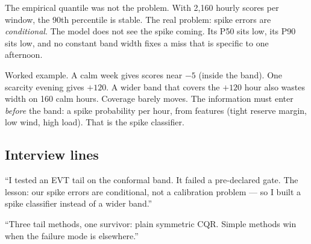 The empirical quantile was not the problem. With 2{,}160 hourly
scores per window, the 90th percentile is stable. The real problem:
spike errors are \emph{conditional}. The model does not see the
spike coming. Its P50 sits low, its P90 sits low, and no constant
band width fixes a miss that is specific to one afternoon.

Worked example. A calm week gives scores near $-5$ (inside the band).
One scarcity evening gives $+120$. A wider band that covers the $+120$
hour also wastes width on 160 calm hours. Coverage barely moves.
The information must enter \emph{before} the band: a spike
probability per hour, from features (tight reserve margin, low wind,
high load). That is the spike classifier.

\subsection{Interview lines}

``I tested an EVT tail on the conformal band. It failed a
pre-declared gate. The lesson: our spike errors are conditional,
not a calibration problem --- so I built a spike classifier instead
of a wider band.''

``Three tail methods, one survivor: plain symmetric CQR. Simple
methods win when the failure mode is elsewhere.''
